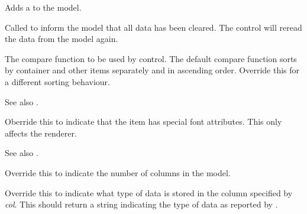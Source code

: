 \label{wxdataviewmodeladdnotifier}


Adds a 
to the model.


\label{wxdataviewmodelcleared}


Called to inform the model that all data has been cleared. The
control will reread the data from the model again.


\label{wxdataviewmodelcompare}


The compare function to be used by control. The default compare function
sorts by container and other items separately and in ascending order.
Override this for a different sorting behaviour.

See also .


\label{wxdataviewmodelgetattr}


Oberride this to indicate that the item has special font attributes.
This only affects the 
 renderer.

See also .

\label{wxdataviewmodelgetcolumncount}


Override this to indicate the number of columns in the model.


\label{wxdataviewmodelgetcolumntype}


Override this to indicate what type of data is stored in the
column specified by {\it col}. This should return a string
indicating the type of data as reported by .


